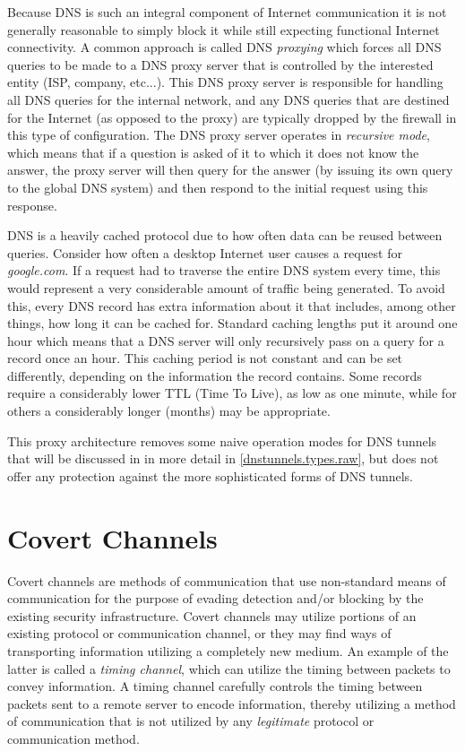 \documentclass[12pt]{report}
\theoremstyle{remark}
\theoremstyle{definition}
\theoremstyle{definition}
\theoremstyle{definition}
\begin{document}
Because DNS is such an integral component of Internet communication it is not
generally reasonable to simply block it while still expecting functional Internet
connectivity. A common approach is called DNS \emph{proxying} which
forces all DNS queries to be made to a DNS proxy server that is controlled by
the interested entity (ISP, company, etc...). This DNS proxy server is
responsible for handling all DNS queries for the internal network, and any DNS
queries that are destined for the Internet (as opposed to the proxy) are
typically dropped by the
firewall in this type of configuration. The DNS proxy server operates in
\emph{recursive mode}, which means that if a question is asked of it to which
it does not know the answer, the proxy server will then query for the answer (by
issuing its own query to the global DNS system) and then respond to the initial
request using this response.

DNS is a heavily cached protocol due to how often data can be reused between
queries. Consider how often a desktop Internet user causes a request for
\emph{google.com}. If a request had to traverse the entire DNS system every
time, this would represent a very considerable amount of traffic being
generated. To avoid this, every DNS record has extra information about it that
includes, among other things, how long it can be cached for. Standard
caching lengths put it around one hour which means that a DNS server will only
recursively pass on a query for a record once an hour. This caching period is
not constant and can be set differently, depending on the information the
record contains. Some records require a considerably lower TTL (Time To Live),
as low as one minute, while for others a considerably longer (months) may be
appropriate.

This proxy architecture removes some naive operation modes for DNS tunnels
that will be discussed in in more detail in \ref{dnstunnels.types.raw}, but does
not offer any protection against the more sophisticated forms of DNS tunnels.

\section{Covert Channels}

Covert channels are methods of communication that use non-standard means of
communication for the purpose of evading detection and/or blocking by the
existing security infrastructure. Covert channels may utilize
portions of an existing protocol or communication channel, or they may find
ways of transporting information utilizing a completely new medium. An example
of the latter is called a \emph{timing channel}, which can utilize the timing
between packets to convey information. A timing channel carefully controls the
timing between packets sent to a remote server to encode information, thereby
utilizing a method of communication that is not utilized by any
\emph{legitimate} protocol or communication method.
\end{document}
